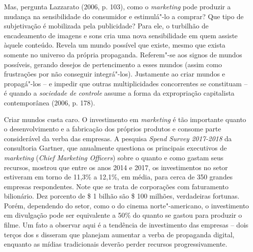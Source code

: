 Mas, pergunta Lazzarato (2006, p. 103), como o \emph{marketing} pode
produzir a mudança na sensibilidade do consumidor e estimulá"-lo a
comprar? Que tipo de subjetivação é mobilizada pela publicidade? Para
ele, o turbilhão de encadeamento de imagens e sons cria uma nova
sensibilidade em quem assiste àquele conteúdo. Revela um mundo possível
que existe, mesmo que exista somente no universo da própria propaganda.
Referem"-se aos signos de mundos possíveis, gerando desejos de
pertencimento a esses mundos (assim como frustrações por não conseguir
integrá"-los). Justamente ao criar mundos e propagá"-los -- e impedir que
outras multiplicidades concorrentes se constituam -- é quando a
\emph{sociedade de controle} assume a forma da expropriação capitalista
contemporânea (2006, p. 178).

Criar mundos custa caro. O investimento em \emph{marketing} é tão
importante quanto o desenvolvimento e a fabricação dos próprios produtos
e consome parte considerável da verba das empresas. A pesquisa \emph{
Spend Survey 2017-2018} da consultoria Gartner, que anualmente questiona
os principais executivos de \emph{marketing} (\emph{Chief Marketing
Officers}) sobre o quanto e como gastam seus recursos, mostrou que entre
os anos 2014 e 2017, os investimentos no setor estiveram em torno de
11,3\% a 12,1\%, em média, para cerca de 350 grandes empresas
respondentes. Note que se trata de corporações com faturamento
bilionário. Dez porcento de \$ 1 bilhão são \$ 100 milhões,
verdadeiras fortunas. Porém, dependendo do setor, como o do cinema
norte"-americano, o investimento em divulgação pode ser equivalente a
50\% do quanto se gastou para produzir o filme. Um fato a observar aqui
é a tendência de investimento das empresas -- dois terços dos s
disseram que planejam aumentar a verba de propaganda digital, enquanto
as mídias tradicionais deverão perder recursos progressivamente.


